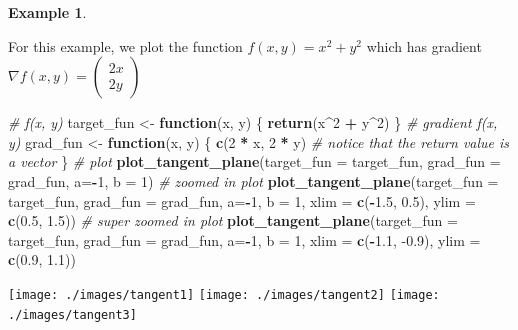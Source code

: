 \documentclass[
]{book}
\newenvironment{Shaded}{\begin{snugshade}}{\end{snugshade}}
\newcommand{\CommentTok}[1]{\textcolor[rgb]{0.56,0.35,0.01}{\textit{#1}}}
\newcommand{\ControlFlowTok}[1]{\textcolor[rgb]{0.13,0.29,0.53}{\textbf{#1}}}
\newcommand{\DataTypeTok}[1]{\textcolor[rgb]{0.13,0.29,0.53}{#1}}
\newcommand{\DecValTok}[1]{\textcolor[rgb]{0.00,0.00,0.81}{#1}}
\newcommand{\FloatTok}[1]{\textcolor[rgb]{0.00,0.00,0.81}{#1}}
\newcommand{\KeywordTok}[1]{\textcolor[rgb]{0.13,0.29,0.53}{\textbf{#1}}}
\newcommand{\NormalTok}[1]{#1}
\newcommand{\OperatorTok}[1]{\textcolor[rgb]{0.81,0.36,0.00}{\textbf{#1}}}
\newcommand{\StringTok}[1]{\textcolor[rgb]{0.31,0.60,0.02}{#1}}
\theoremstyle{definition}
\theoremstyle{definition}
\newtheorem{example}{Example}[chapter]
\theoremstyle{definition}
\theoremstyle{remark}
\begin{document}
\begin{example}
\protect\hypertarget{exm:unlabeled-div-221}{}\label{exm:unlabeled-div-221}

For this example, we plot the function \(f(x, y) = x^2 + y^2\) which has gradient \(\nabla f(x, y) = \begin{pmatrix} 2x \\ 2y\end{pmatrix}\)

\begin{Shaded}
\begin{Highlighting}[]
\CommentTok{# f(x, y)}
\NormalTok{target_fun <-}\StringTok{ }\ControlFlowTok{function}\NormalTok{(x, y) \{}
    \KeywordTok{return}\NormalTok{(x}\OperatorTok{^}\DecValTok{2} \OperatorTok{+}\StringTok{ }\NormalTok{y}\OperatorTok{^}\DecValTok{2}\NormalTok{)}
\NormalTok{\}}
\CommentTok{# gradient f(x, y)}
\NormalTok{grad_fun <-}\StringTok{ }\ControlFlowTok{function}\NormalTok{(x, y) \{}
    \KeywordTok{c}\NormalTok{(}\DecValTok{2} \OperatorTok{*}\StringTok{ }\NormalTok{x, }\DecValTok{2} \OperatorTok{*}\StringTok{ }\NormalTok{y) }\CommentTok{# notice that the return value is a vector}
\NormalTok{\}}
\CommentTok{# plot }
\KeywordTok{plot_tangent_plane}\NormalTok{(}\DataTypeTok{target_fun =}\NormalTok{ target_fun, }\DataTypeTok{grad_fun =}\NormalTok{ grad_fun, }\DataTypeTok{a=}\OperatorTok{-}\DecValTok{1}\NormalTok{, }\DataTypeTok{b =} \DecValTok{1}\NormalTok{)}
\CommentTok{# zoomed in plot}
\KeywordTok{plot_tangent_plane}\NormalTok{(}\DataTypeTok{target_fun =}\NormalTok{ target_fun, }\DataTypeTok{grad_fun =}\NormalTok{ grad_fun, }\DataTypeTok{a=}\OperatorTok{-}\DecValTok{1}\NormalTok{, }\DataTypeTok{b =} \DecValTok{1}\NormalTok{, }\DataTypeTok{xlim =} \KeywordTok{c}\NormalTok{(}\OperatorTok{-}\FloatTok{1.5}\NormalTok{, }\FloatTok{0.5}\NormalTok{), }\DataTypeTok{ylim =} \KeywordTok{c}\NormalTok{(}\FloatTok{0.5}\NormalTok{, }\FloatTok{1.5}\NormalTok{))}
\CommentTok{# super zoomed in plot}
\KeywordTok{plot_tangent_plane}\NormalTok{(}\DataTypeTok{target_fun =}\NormalTok{ target_fun, }\DataTypeTok{grad_fun =}\NormalTok{ grad_fun, }\DataTypeTok{a=}\OperatorTok{-}\DecValTok{1}\NormalTok{, }\DataTypeTok{b =} \DecValTok{1}\NormalTok{, }\DataTypeTok{xlim =} \KeywordTok{c}\NormalTok{(}\OperatorTok{-}\FloatTok{1.1}\NormalTok{, }\FloatTok{-0.9}\NormalTok{), }\DataTypeTok{ylim =} \KeywordTok{c}\NormalTok{(}\FloatTok{0.9}\NormalTok{, }\FloatTok{1.1}\NormalTok{))}
\end{Highlighting}
\end{Shaded}

\texttt{[image: ./images/tangent1]}
\texttt{[image: ./images/tangent2]}
\texttt{[image: ./images/tangent3]}

\end{example}
\end{document}
